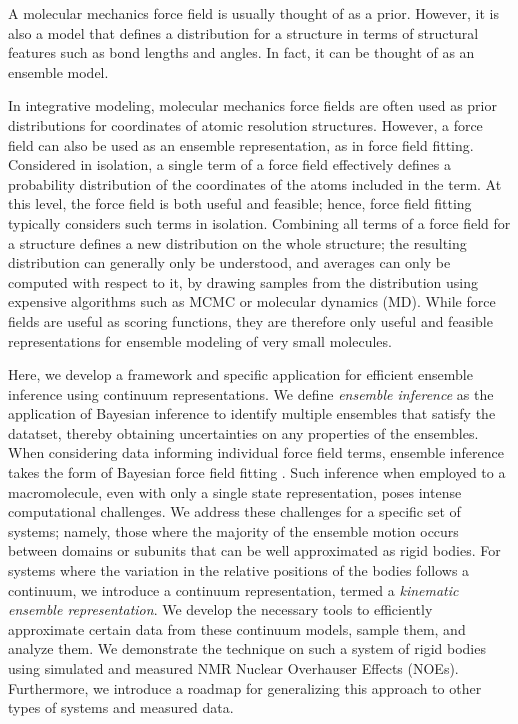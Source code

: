 \documentclass[../main.tex]{subfiles}
\begin{document}
\begin{refsection}
A molecular mechanics force field is usually thought of as a prior.
However, it is also a model that defines a distribution for a structure in terms of structural features such as bond lengths and angles.
In fact, it can be thought of as an ensemble model.

In integrative modeling, molecular mechanics force fields are often used as prior distributions for coordinates of atomic resolution structures.
However, a force field can also be used as an ensemble representation, as in force field fitting.
Considered in isolation, a single term of a force field effectively defines a probability distribution of the coordinates of the atoms included in the term.
At this level, the force field is both useful and feasible; hence, force field fitting typically considers such terms in isolation.
Combining all terms of a force field for a structure defines a new distribution on the whole structure;
the resulting distribution can generally only be understood, and averages can only be computed with respect to it, by drawing samples from the distribution using expensive algorithms such as MCMC or molecular dynamics (MD).
While force fields are useful as scoring functions, they are therefore only useful and feasible representations for ensemble modeling of very small molecules.

Here, we develop a framework and specific application for efficient ensemble inference using continuum representations.
We define \emph{ensemble inference} as the application of Bayesian inference to identify multiple ensembles that satisfy the datatset, thereby obtaining uncertainties on any properties of the ensembles.
When considering data informing individual force field terms, ensemble inference takes the form of Bayesian force field fitting \cite{REF}.
Such inference when employed to a macromolecule, even with only a single state representation, poses intense computational challenges.
We address these challenges for a specific set of systems; namely, those where the majority of the ensemble motion occurs between domains or subunits that can be well approximated as rigid bodies.
For systems where the variation in the relative positions of the bodies follows a continuum, we introduce a continuum representation, termed a \emph{kinematic ensemble representation}.
We develop the necessary tools to efficiently approximate certain data from these continuum models, sample them, and analyze them.
We demonstrate the technique on such a system of rigid bodies using simulated and measured NMR Nuclear Overhauser Effects (NOEs).
Furthermore, we introduce a roadmap for generalizing this approach to other types of systems and measured data.


\end{refsection}
\end{document}
